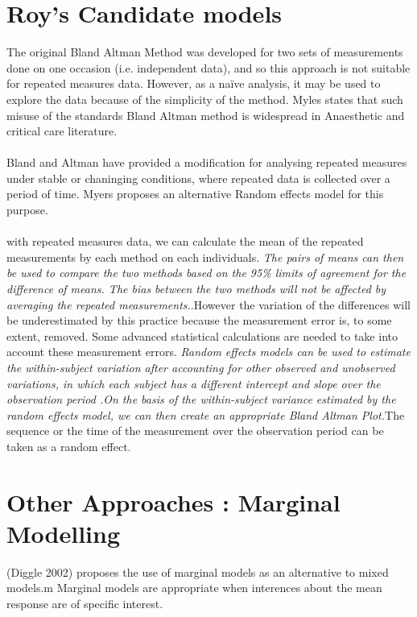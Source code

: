 \documentclass[12pt, a4paper]{report}
\theoremstyle{plain}
\theoremstyle{definition}
\theoremstyle{remark}
\begin{document}
\section{Roy's Candidate models}
The original Bland Altman Method was developed for two sets of
measurements done on one occasion (i.e. independent data), and so
this approach is not suitable for repeated measures data. However,
as a naïve analysis, it may be used to explore the data because of
the simplicity of the method. Myles states that such misuse of the
standards Bland Altman method is widespread in Anaesthetic and
critical care literature.
\\
\\
Bland and Altman have provided a modification for analysing
repeated measures under stable or chaninging conditions, where
repeated data is collected over a period of time. Myers proposes
an alternative Random effects model for this purpose.
\\
\\
with repeated measures data, we can
calculate the mean of the repeated measurements by each method on
each individuals. \emph{ The pairs of means can then be used to
	compare the two methods based on the 95\% limits of agreement for
	the difference of means. The bias between the two methods will not
	be affected by averaging the repeated measurements.}.However the
variation of the differences will be underestimated by this
practice because the measurement error is, to some extent,
removed. Some advanced statistical calculations are needed to take
into account these measurement errors. \emph{Random effects models
	can be used to estimate the within-subject variation after
	accounting for other observed and unobserved variations, in which
	each subject has a different intercept and slope over the
	observation period .On the basis of the within-subject variance
	estimated by the random effects model, we can then create an
	appropriate Bland Altman Plot.}The sequence or the time of the
measurement over the observation period can be taken as a random
effect.










\section{Other Approaches : Marginal Modelling}
(Diggle 2002) proposes the use of marginal models as an
alternative to mixed models.m Marginal models are appropriate when
interences about the mean response are of specific interest.
\end{document}

